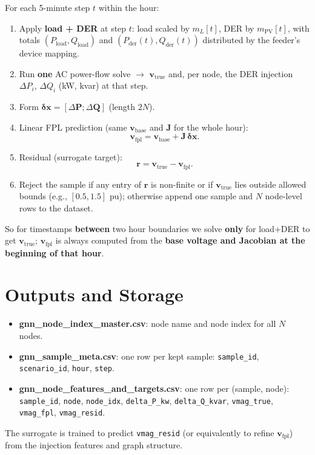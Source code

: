 \documentclass[11pt]{article}
\begin{document}
For each 5-minute step $t$ within the hour:
\begin{enumerate}[noitemsep]
  \item Apply \textbf{load + DER} at step $t$: load scaled by $m_L[t]$, DER by $m_{\mathrm{PV}}[t]$, with totals $(P_{\mathrm{load}}, Q_{\mathrm{load}})$ and $(P_{\mathrm{der}}(t), Q_{\mathrm{der}}(t))$ distributed by the feeder's device mapping.
  \item Run \textbf{one} AC power-flow solve $\to$ $\mathbf{v}_{\mathrm{true}}$ and, per node, the DER injection $\Delta P_i$, $\Delta Q_i$ (kW, kvar) at that step.
  \item Form $\boldsymbol{\delta}\mathbf{x} = [\Delta\mathbf{P}; \Delta\mathbf{Q}]$ (length $2N$).
  \item Linear FPL prediction (same $\mathbf{v}_{\mathrm{base}}$ and $\mathbf{J}$ for the whole hour):
  \begin{equation}
    \mathbf{v}_{\mathrm{fpl}} = \mathbf{v}_{\mathrm{base}} + \mathbf{J} \, \boldsymbol{\delta}\mathbf{x}.
  \end{equation}
  \item Residual (surrogate target):
  \begin{equation}
    \mathbf{r} = \mathbf{v}_{\mathrm{true}} - \mathbf{v}_{\mathrm{fpl}}.
  \end{equation}
  \item Reject the sample if any entry of $\mathbf{r}$ is non-finite or if $\mathbf{v}_{\mathrm{true}}$ lies outside allowed bounds (e.g., $[0.5, 1.5]$ pu); otherwise append one sample and $N$ node-level rows to the dataset.
\end{enumerate}

So for timestamps \textbf{between} two hour boundaries we solve \textbf{only} for load+DER to get $\mathbf{v}_{\mathrm{true}}$; $\mathbf{v}_{\mathrm{fpl}}$ is always computed from the \textbf{base voltage and Jacobian at the beginning of that hour}.

\section{Outputs and Storage}

\begin{itemize}[noitemsep]
  \item \textbf{gnn\_node\_index\_master.csv}: node name and node index for all $N$ nodes.
  \item \textbf{gnn\_sample\_meta.csv}: one row per kept sample: \texttt{sample\_id}, \texttt{scenario\_id}, \texttt{hour}, \texttt{step}.
  \item \textbf{gnn\_node\_features\_and\_targets.csv}: one row per (sample, node): \texttt{sample\_id}, \texttt{node}, \texttt{node\_idx}, \texttt{delta\_P\_kw}, \texttt{delta\_Q\_kvar}, \texttt{vmag\_true}, \texttt{vmag\_fpl}, \texttt{vmag\_resid}.
\end{itemize}
The surrogate is trained to predict \texttt{vmag\_resid} (or equivalently to refine $\mathbf{v}_{\mathrm{fpl}}$) from the injection features and graph structure.
\end{document}
